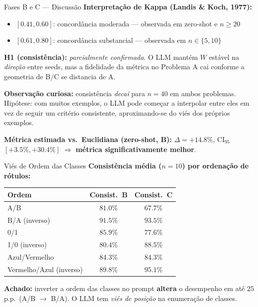 \documentclass[aspectratio=169,10pt]{beamer}
\begin{document}
\begin{frame}{Fases B e C --- Discuss\~ao}
  \footnotesize
  \textbf{Interpreta\c{c}\~ao de Kappa (Landis \& Koch, 1977):}
  \begin{itemize}
    \item $[0.41, 0.60]$: concord\^ancia moderada --- observada em zero-shot e $n \geq 20$
    \item $[0.61, 0.80]$: concord\^ancia substancial --- observada em $n \in \{5, 10\}$
  \end{itemize}
  \medskip

  \textbf{H1 (consist\^encia):} \emph{parcialmente confirmada}. O LLM mant\'em $W$ est\'avel na \emph{dire\c{c}\~ao} entre seeds, mas a fidelidade da m\'etrica no Problema A cai conforme a geometria de B/C se distancia de A.
  \medskip

  \textbf{Observa\c{c}\~ao curiosa:} consist\^encia \emph{decai} para $n=40$ em ambos problemas. Hip\'otese: com muitos exemplos, o LLM pode come\c{c}ar a interpolar entre eles em vez de seguir um crit\'erio consistente, aproximando-se do vi\'es dos pr\'oprios exemplos.
  \medskip

  \textbf{M\'etrica estimada vs.\ Euclidiana (zero-shot, B):} $\Delta = +14.8\%$, CI$_{95}$ $[+3.5\%, +30.4\%]$ $\Rightarrow$ \textbf{m\'etrica significativamente melhor}.
\end{frame}

\begin{frame}{Vi\'es de Ordem das Classes}
  \scriptsize
  \textbf{Consist\^encia m\'edia ($n=10$) por ordena\c{c}\~ao de r\'otulos:}
  \begin{center}
  \begin{tabular}{lcc}
    \toprule
    \textbf{Ordem} & \textbf{Consist.~B} & \textbf{Consist.~C} \\
    \midrule
    A/B           & $81.0\%$ & $67.7\%$ \\
    B/A (inverso) & $91.5\%$ & $93.5\%$ \\
    0/1           & $85.9\%$ & $77.6\%$ \\
    1/0 (inverso) & $80.4\%$ & $88.5\%$ \\
    Azul/Vermelho & $84.3\%$ & $84.3\%$ \\
    Vermelho/Azul (inverso) & $89.8\%$ & $95.1\%$ \\
    \bottomrule
  \end{tabular}
  \end{center}
  \medskip

  \textbf{Achado:} inverter a ordem das classes no prompt \textbf{altera} o desempenho em at\'e $25$ p.p.\ (A/B $\to$ B/A). O LLM tem \emph{vi\'es de posi\c{c}\~ao} na enumera\c{c}\~ao de classes.
\end{frame}
\end{document}
